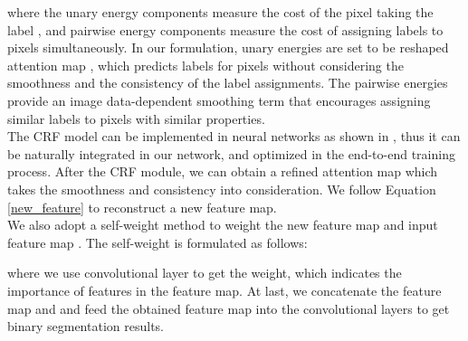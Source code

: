 \documentclass[runningheads]{llncs}
\begin{document}
where the unary energy components  measure the cost of the pixel  taking the label , and pairwise energy components   measure the cost of assigning labels  to pixels  simultaneously. In our formulation, unary energies are set to be reshaped attention map , which predicts labels for pixels without considering the smoothness and the consistency of the label assignments. The pairwise energies provide an image data-dependent smoothing term that encourages assigning similar labels to pixels with similar properties. \\
\indent The CRF model can be implemented in neural networks as shown in \cite{CRFasRNN,crf_conv}, thus it can be naturally   integrated in our network, and optimized in the end-to-end training process. After the CRF module, we can obtain a refined attention map which takes the smoothness and consistency  into consideration. We follow Equation \ref{new_feature} to reconstruct a new feature map. \\
\indent We also adopt a self-weight method to weight the new feature map  and input feature map . The self-weight is formulated as follows:

where we use  convolutional layer to get the weight, which indicates the importance of features in the feature map. At last, we concatenate the feature map  and  and feed the obtained feature map into the convolutional layers to get binary  segmentation results.
\end{document}

